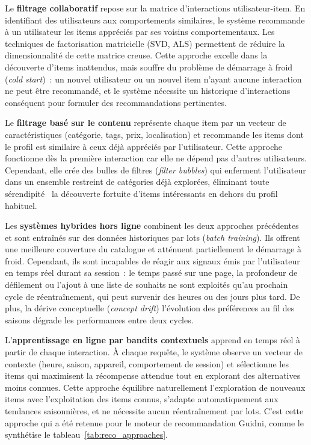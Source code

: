 Le \textbf{filtrage collaboratif} repose sur la matrice d'interactions utilisateur-item. En
identifiant des utilisateurs aux comportements similaires, le système recommande à un utilisateur
les items appréciés par ses \og{}voisins\fg{} comportementaux. Les techniques de factorisation
matricielle (SVD, ALS) permettent de réduire la dimensionnalité de cette matrice creuse. Cette
approche excelle dans la découverte d'items inattendus, mais souffre du problème de démarrage
à froid (\textit{cold start})~: un nouvel utilisateur ou un nouvel item n'ayant aucune interaction
ne peut être recommandé, et le système nécessite un historique d'interactions conséquent pour
formuler des recommandations pertinentes.

Le \textbf{filtrage basé sur le contenu} représente chaque item par un vecteur de
caractéristiques (catégorie, tags, prix, localisation) et recommande les items dont le profil
est similaire à ceux déjà appréciés par l'utilisateur. Cette approche fonctionne dès la première
interaction car elle ne dépend pas d'autres utilisateurs. Cependant, elle crée des bulles de
filtres (\textit{filter bubbles}) qui enferment l'utilisateur dans un ensemble restreint de
catégories déjà explorées, éliminant toute sérendipité~  la découverte fortuite d'items
intéressants en dehors du profil habituel.

Les \textbf{systèmes hybrides hors ligne} combinent les deux approches précédentes et sont
entraînés sur des données historiques par lots (\textit{batch training}). Ils offrent une
meilleure couverture du catalogue et atténuent partiellement le démarrage à froid. Cependant, ils
sont incapables de réagir aux signaux émis par l'utilisateur en temps réel durant sa session~:
le temps passé sur une page, la profondeur de défilement ou l'ajout à une liste de souhaits ne
sont exploités qu'au prochain cycle de réentraînement, qui peut survenir des heures ou des jours
plus tard. De plus, la dérive conceptuelle (\textit{concept drift})   l'évolution des
préférences au fil des saisons   dégrade les performances entre deux cycles.

L'\textbf{apprentissage en ligne par bandits contextuels} apprend en temps réel à partir de
chaque interaction. À chaque requête, le système observe un vecteur de contexte (heure, saison,
appareil, comportement de session) et sélectionne les items qui maximisent la récompense attendue
tout en explorant des alternatives moins connues. Cette approche équilibre naturellement
l'exploration de nouveaux items avec l'exploitation des items connus, s'adapte automatiquement
aux tendances saisonnières, et ne nécessite aucun réentraînement par lots. C'est cette approche
qui a été retenue pour le moteur de recommandation Guidni, comme le synthétise le tableau~\ref{tab:reco_approaches}.

